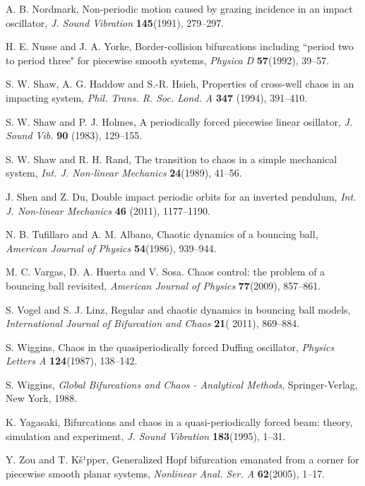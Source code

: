 \documentclass[12pt,openany,CJK,oneside]{cctbook}
\begin{document}
{{\begin{thebibliography}{999}
 A. B. Nordmark, Non-periodic motion caused by grazing incidence in an impact oscillator, {\it J. Sound Vibration} {\bf 145}(1991), 279--297.

 H. E. Nusse and J. A. Yorke, Border-collision bifurcations
including ``period two to period three" for piecewise smooth systems, {\it Physica D}
{\bf 57}(1992), 39--57.

 S. W. Shaw, A. G. Haddow and S.-R. Hsieh,
 Properties of cross-well chaos in an impacting system,
{\it Phil. Trans. R. Soc. Lond. A } {\bf 347} (1994), 391--410.

 S. W. Shaw and P. J. Holmes, A periodically forced piecewise linear osillator,
{\it J. Sound Vib.} {\bf 90} (1983), 129--155.

 S. W. Shaw and R. H. Rand, The transition to chaos in a
simple mechanical system, {\it Int. J. Non-linear Mechanics} {\bf 24}(1989), 41--56.

 J. Shen and Z. Du, Double impact periodic orbits for an inverted pendulum,
{\it Int. J. Non-linear Mechanics}  {\bf 46} (2011), 1177--1190.

 N. B. Tufillaro and A. M. Albano, Chaotic dynamics of a bouncing ball, {\it American Journal of Physics} {\bf 54}(1986), 939--944.

 M. C. Vargas, D. A. Huerta and V. Sosa. Chaos control: the problem of a bouncing ball revisited, {\it American Journal of Physics} {\bf 77}(2009), 857--861.

 S. Vogel and S. J. Linz, Regular and chaotic dynamics in bouncing ball models, {\it International Journal of Bifurcation and Chaos} {\bf 21}( 2011), 869--884.

 S. Wiggins, Chaos in the quasiperiodically forced Duffing oscillator,
{\it Physics Letters A} {\bf 124}(1987), 138--142.

 S. Wiggins, {\it Global Bifurcations and Chaos - Analytical Methods}, Springer-Verlag, New York, 1988.

 K. Yagasaki, Bifurcations and chaos in a quasi-periodically forced beam: theory, simulation and experiment,
{\it J. Sound Vibration} {\bf 183}(1995), 1--31.


 Y. Zou and T. Kš¹pper, Generalized Hopf bifurcation emanated from a corner for piecewise smooth planar systems, {\it Nonlinear Anal. Ser. A} {\bf 62}(2005), 1--17.


\end{thebibliography}}}
\end{document}
